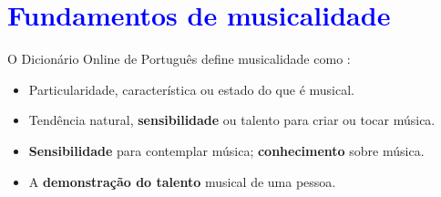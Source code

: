 
\chapter{\textcolor{blue}{Fundamentos de musicalidade}}

\begin{definition}[Musicalidade:] 
\label{def:Musicalidade}
O Dicionário Online de Português define musicalidade como \cite{diciomusicalidade}:
\begin{itemize}
\item Particularidade, característica ou estado do que é musical.
\item Tendência natural, \textbf{sensibilidade} ou talento para criar ou tocar música.
\item \textbf{Sensibilidade} para contemplar música; \textbf{conhecimento} sobre música.
\item A \textbf{demonstração do talento} musical de uma pessoa.
\end{itemize}
\end{definition}















